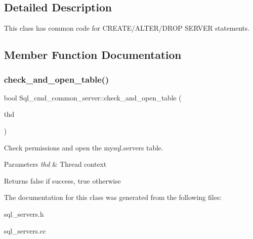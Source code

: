 \subsection{Detailed Description}
This class has common code for C\+R\+E\+A\+T\+E/\+A\+L\+T\+E\+R/\+D\+R\+OP S\+E\+R\+V\+ER statements. 

\subsection{Member Function Documentation}
\mbox{\label{classSql__cmd__common__server_aee2b6c2c62fa898fdc8b630e462df5ef}} 
\subsubsection{\texorpdfstring{check\+\_\+and\+\_\+open\+\_\+table()}{check\_and\_open\_table()}}
{\footnotesize\ttfamily bool Sql\+\_\+cmd\+\_\+common\+\_\+server\+::check\+\_\+and\+\_\+open\+\_\+table (\begin{DoxyParamCaption}\item[{T\+HD $\ast$}]{thd }\end{DoxyParamCaption})\hspace{0.3cm}{\ttfamily [protected]}}

Check permissions and open the mysql.\+servers table.


\begin{DoxyParams}{Parameters}
{\em thd} & Thread context\\
\hline
\end{DoxyParams}
\begin{DoxyReturn}{Returns}
false if success, true otherwise 
\end{DoxyReturn}


The documentation for this class was generated from the following files\+:\begin{DoxyCompactItemize}
\item 
sql\+\_\+servers.\+h\item 
sql\+\_\+servers.\+cc\end{DoxyCompactItemize}

